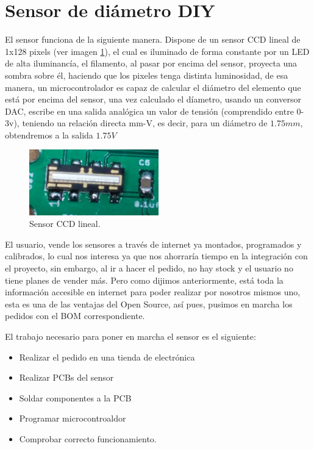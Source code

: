 \section{Sensor de diámetro DIY}
\label{sec:sensor}
El sensor funciona de la siguiente manera. Dispone de un sensor CCD lineal de 1x128 pixels (ver imagen \ref{fig:sens_CCD}), el cual es iluminado de forma constante por un LED de alta iluminancía, el filamento, al pasar por encima del sensor, proyecta una sombra sobre él, haciendo que los pixeles tenga distinta luminosidad, de esa manera, un microcontrolador es capaz de calcular el diámetro del elemento que está por encima del sensor, una vez calculado el díametro, usando un conversor DAC, escribe en una salida analógica un valor de tensión  (comprendido entre 0-3v), teniendo ua relación directa mm-V, es decir, para un diámetro de $1.75 mm$, obtendremos a la salida $1.75 V$\\
   \begin{figure}[H]
            \centering
            \includegraphics[width=0.5\textwidth]{images/sensor/IMG_20150414_135533_.jpg}
            \caption{Sensor CCD lineal.}
            \label{fig:sens_CCD}
    \end{figure}

El usuario, vende los sensores a través de internet ya montados, programados y calibrados, lo cual nos interesa ya que nos ahorraría tiempo en la integración con el proyecto, sin embargo, al ir a hacer el pedido, no hay stock y el usuario no tiene planes de vender más. Pero como dijimos anteriormente, está toda la información accesible en internet para poder realizar por nosotros mismos uno, esta es una de las ventajas del Open Source, así pues, pusimos en marcha los pedidos con el BOM correspondiente.

El trabajo necesario para poner en marcha el sensor es el siguiente:

\begin{itemize}
\item{Realizar el pedido en una tienda de electrónica}
\item{Realizar PCBs del sensor}
\item{Soldar componentes a la PCB}
\item{Programar microcontroaldor}
\item{Comprobar correcto funcionamiento.}
\end{itemize}

